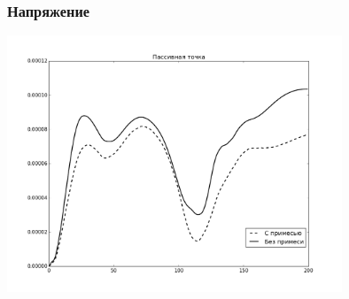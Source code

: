 \documentclass[14pt]{beamer}
\begin{document}
\begin{frame}
\frametitle{Напряжение}
    \begin{center}
        \includegraphics[width=10cm]{forces_passive_point.png}
    \end{center}
\end{frame}
\end{document}
